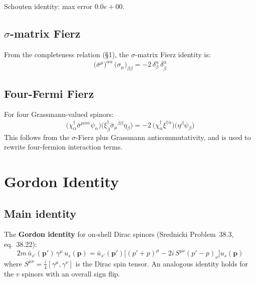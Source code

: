 \documentclass[12pt]{article}
\newcommand{\verified}[1]{\textcolor{verifygreen}{\checkmark\; #1}}
\begin{document}
\verified{Schouten identity: max error $0.0e+00$.}

\subsection{$\sigma$-matrix Fierz}

From the completeness relation (§1), the $\sigma$-matrix Fierz identity is:
\begin{equation}
  \bigl(\bar\sigma^\mu\bigr)^{\dot\alpha\alpha}\,\bigl(\sigma_\mu\bigr)_{\beta\dot\beta}
  = -2\,\delta^\alpha_\beta\,\delta^{\dot\alpha}_{\dot\beta}
  \tag{38.18}
\end{equation}

\subsection{Four-Fermi Fierz}

For four Grassmann-valued spinors:
\begin{equation}
  \bigl(\chi^\dagger_{\dot\alpha}\bar\sigma^{\mu\dot\alpha\alpha}\psi_\alpha\bigr)
  \bigl(\xi^\dagger_{\dot\beta}\bar\sigma_\mu{}^{\dot\beta\beta}\eta_\beta\bigr)
  = -2\,\bigl(\chi^\dagger_{\dot\alpha}\xi^{\dagger\dot\alpha}\bigr)
         \bigl(\eta^\beta\psi_\beta\bigr)
  \tag{38.21}
\end{equation}
This follows from the $\sigma$-Fierz plus Grassmann anticommutativity,
and is used to rewrite four-fermion interaction terms.

\section{Gordon Identity}

\subsection{Main identity}

The \textbf{Gordon identity} for on-shell Dirac spinors
(Srednicki Problem~38.3, eq.~38.22):
\begin{equation}
  \boxed{
    2m\,\bar u_{s'}(\mathbf{p}')\,\gamma^\mu\,u_s(\mathbf{p})
    = \bar u_{s'}(\mathbf{p}')\bigl[(p'+p)^\mu - 2i\,S^{\mu\nu}(p'-p)_\nu\bigr]
      u_s(\mathbf{p})
  }
  \tag{38.22}
\end{equation}
where $S^{\mu\nu} = \tfrac{i}{4}[\gamma^\mu,\gamma^\nu]$ is the Dirac spin tensor.
An analogous identity holds for the $v$ spinors with an overall sign flip.
\end{document}
